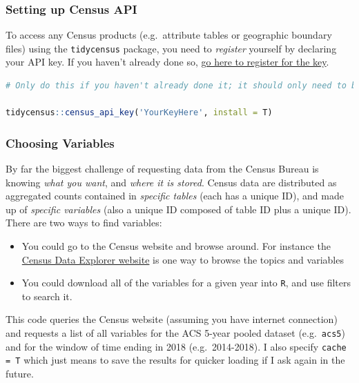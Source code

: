 \documentclass[
]{book}
\newcommand{\passthrough}[1]{#1}
\providecommand{\tightlist}{%
  \setlength{\itemsep}{0pt}\setlength{\parskip}{0pt}}
\begin{document}
\hypertarget{setting-up-census-api}{%
\subsubsection{Setting up Census API}\label{setting-up-census-api}}

To access any Census products (e.g.~attribute tables or geographic boundary files) using the \passthrough{\lstinline!tidycensus!} package, you need to \emph{register} yourself by declaring your API key. If you haven't already done so, \href{https://api.census.gov/data/key_signup.html}{go here to register for the key}.

\begin{lstlisting}[language=R]
# Only do this if you haven't already done it; it should only need to be done once.

tidycensus::census_api_key('YourKeyHere', install = T) 
\end{lstlisting}

\hypertarget{choosing-variables}{%
\subsubsection{Choosing Variables}\label{choosing-variables}}

By far the biggest challenge of requesting data from the Census Bureau is knowing \emph{what you want}, and \emph{where it is stored}. Census data are distributed as aggregated counts contained in \emph{specific tables} (each has a unique ID), and made up of \emph{specific variables} (also a unique ID composed of table ID plus a unique ID). There are two ways to find variables:

\begin{itemize}
\tightlist
\item
  You could go to the Census website and browse around. For instance the \href{https://data.census.gov/cedsci/}{Census Data Explorer website} is one way to browse the topics and variables
\item
  You could download all of the variables for a given year into \passthrough{\lstinline!R!}, and use filters to search it.
\end{itemize}

This code queries the Census website (assuming you have internet connection) and requests a list of all variables for the ACS 5-year pooled dataset (e.g.~\passthrough{\lstinline!acs5!}) and for the window of time ending in 2018 (e.g.~2014-2018). I also specify \passthrough{\lstinline!cache = T!} which just means to save the results for quicker loading if I ask again in the future.
\end{document}
